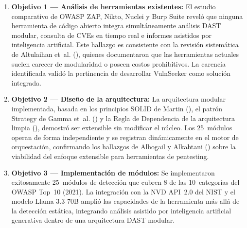 \documentclass[12pt, a4paper]{article}
\begin{document}
\begin{enumerate}
    \item \textbf{Objetivo 1 — Análisis de herramientas existentes:} El estudio
    comparativo de OWASP ZAP, Nikto, Nuclei y Burp Suite reveló que ninguna
    herramienta de código abierto integra simultáneamente análisis DAST
    modular, consulta de CVEs en tiempo real e informes asistidos por
    inteligencia artificial. Este hallazgo es consistente con la revisión
    sistemática de Altulaihan et~al. (\citeyear*{altulaihan2023}), quienes
    documentaron que las herramientas actuales suelen carecer de modularidad
    o poseen costos prohibitivos. La carencia identificada validó la
    pertinencia de desarrollar VulnSeeker como solución integrada.

    \item \textbf{Objetivo 2 — Diseño de la arquitectura:} La arquitectura
    modular implementada, basada en los principios SOLID de Martin
    (\citeyear*{martin2003}), el patrón Strategy de Gamma et~al.
    (\citeyear*{gamma1995}) y la Regla de Dependencia de la arquitectura
    limpia (\cite{martin2017}), demostró ser extensible sin modificar el
    núcleo. Los 25~módulos operan de forma independiente y se registran
    dinámicamente en el motor de orquestación, confirmando los hallazgos
    de Alhogail y Alkahtani (\citeyear*{alhogail2024}) sobre la viabilidad
    del enfoque extensible para herramientas de pentesting.

    \item \textbf{Objetivo 3 — Implementación de módulos:} Se implementaron
    exitosamente 25~módulos de detección que cubren 8 de las 10~categorías
    del OWASP Top~10 (2021). La integración con la NVD API~2.0 del NIST y
    el modelo Llama 3.3 70B amplió las capacidades de la herramienta más allá
    de la detección estática, integrando análisis asistido por inteligencia artificial
    generativa dentro de una arquitectura DAST modular.


\end{enumerate}
\end{document}
